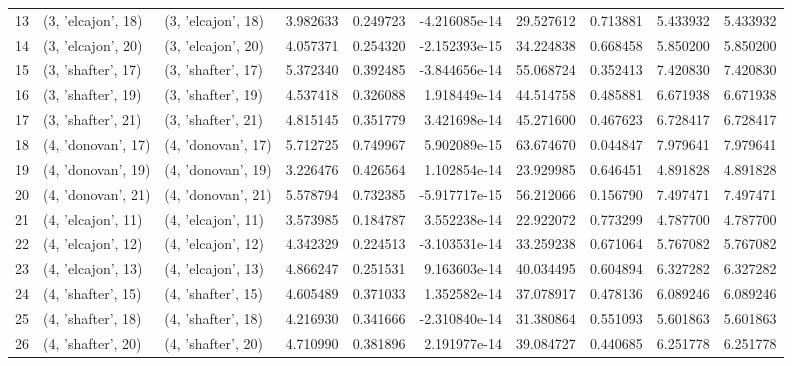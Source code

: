 \begin{tabular}{lllrrrrrrr}
13 &  (3, 'elcajon', 18) &  (3, 'elcajon', 18) &  3.982633 &   0.249723 & -4.216085e-14 &   29.527612 &  0.713881 &   5.433932 &   5.433932 \\
14 &  (3, 'elcajon', 20) &  (3, 'elcajon', 20) &  4.057371 &   0.254320 & -2.152393e-15 &   34.224838 &  0.668458 &   5.850200 &   5.850200 \\
15 &  (3, 'shafter', 17) &  (3, 'shafter', 17) &  5.372340 &   0.392485 & -3.844656e-14 &   55.068724 &  0.352413 &   7.420830 &   7.420830 \\
16 &  (3, 'shafter', 19) &  (3, 'shafter', 19) &  4.537418 &   0.326088 &  1.918449e-14 &   44.514758 &  0.485881 &   6.671938 &   6.671938 \\
17 &  (3, 'shafter', 21) &  (3, 'shafter', 21) &  4.815145 &   0.351779 &  3.421698e-14 &   45.271600 &  0.467623 &   6.728417 &   6.728417 \\
18 &  (4, 'donovan', 17) &  (4, 'donovan', 17) &  5.712725 &   0.749967 &  5.902089e-15 &   63.674670 &  0.044847 &   7.979641 &   7.979641 \\
19 &  (4, 'donovan', 19) &  (4, 'donovan', 19) &  3.226476 &   0.426564 &  1.102854e-14 &   23.929985 &  0.646451 &   4.891828 &   4.891828 \\
20 &  (4, 'donovan', 21) &  (4, 'donovan', 21) &  5.578794 &   0.732385 & -5.917717e-15 &   56.212066 &  0.156790 &   7.497471 &   7.497471 \\
21 &  (4, 'elcajon', 11) &  (4, 'elcajon', 11) &  3.573985 &   0.184787 &  3.552238e-14 &   22.922072 &  0.773299 &   4.787700 &   4.787700 \\
22 &  (4, 'elcajon', 12) &  (4, 'elcajon', 12) &  4.342329 &   0.224513 & -3.103531e-14 &   33.259238 &  0.671064 &   5.767082 &   5.767082 \\
23 &  (4, 'elcajon', 13) &  (4, 'elcajon', 13) &  4.866247 &   0.251531 &  9.163603e-14 &   40.034495 &  0.604894 &   6.327282 &   6.327282 \\
24 &  (4, 'shafter', 15) &  (4, 'shafter', 15) &  4.605489 &   0.371033 &  1.352582e-14 &   37.078917 &  0.478136 &   6.089246 &   6.089246 \\
25 &  (4, 'shafter', 18) &  (4, 'shafter', 18) &  4.216930 &   0.341666 & -2.310840e-14 &   31.380864 &  0.551093 &   5.601863 &   5.601863 \\
26 &  (4, 'shafter', 20) &  (4, 'shafter', 20) &  4.710990 &   0.381896 &  2.191977e-14 &   39.084727 &  0.440685 &   6.251778 &   6.251778 \\
\bottomrule
\end{tabular}
